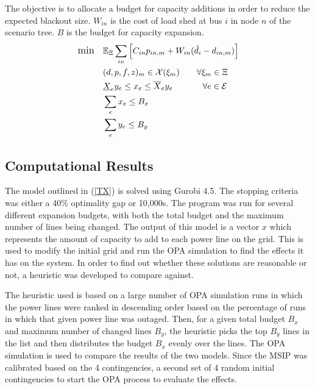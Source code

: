The objective is to allocate a budget for capacity additions in order to reduce the expected blackout size.  $W_{in}$ is the cost of load shed at bus $i$ in node $n$ of the scenario tree.  $B$ is the budget for capacity expansion.
\begin{subequations}

\begin{align} \displaystyle
	{\large \mbox{min}} \hspace{10px} &  \Expect_\Xi \sum_{in} \left[ C_{in}  p_{in,m}  + W_{in} (\hat{d}_{i} - d_{in,m}) \right]	\\
	&(d,p,f,z)_m  \in \cX(\xi_m)    \hspace{20px}   \forall \xi_m \in \Xi	\\
	& \underline{X}_e y_e \le x_e \le \overline{X}_e y_e \hspace{35px} \forall e \in \cE\\
	&\sum_e x_e \le B_x 	\\
	& \sum_e y_e \le B_y  
\end{align}
\label{TX}
\end{subequations}



\subsection{Computational Results}
The model outlined in (\ref{TX}) is solved using Gurobi 4.5.  The stopping criteria was either a 40\% optimality gap or 10,000s.  The program was run for several different expansion budgets, with both the total budget and the maximum number of lines being changed.  The output of this model is a vector $x$ which represents the amount of capacity to add to each power line on the grid.  This is used to modify the initial grid and run the OPA simulation to find the effects it has on the system.  In order to find out whether these solutions are reasonable or not, a heuristic was developed to compare against.

The heuristic used is based on a large number of OPA simulation runs in which the power lines were ranked in descending order based on the percentage of runs in which that given power line was outaged.  Then, for a given total budget $B_x$ and maximum number of changed lines $B_y$, the heuristic picks the top $B_y$ lines in the list and then distributes the budget $B_x$ evenly over the lines.  The OPA simulation is used to compare the results of the two models.  Since the MSIP was calibrated based on the 4 contingencies, a second set of 4 random initial contingencies to start the OPA process to evaluate the effects.




